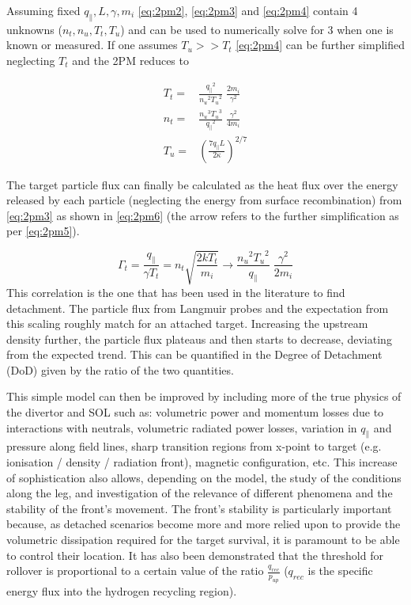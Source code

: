 Assuming fixed $q_{\parallel}, L, \gamma, m_i$ \autoref{eq:2pm2}, \ref{eq:2pm3} and \ref{eq:2pm4} contain 4 unknowns ($n_t, n_u, T_t, T_u$) and can be used to numerically solve for 3 when one is known or measured. If one assumes $T_u >> T_t$ %
\autoref{eq:2pm4} can be further simplified neglecting $T_t$ and the 2PM reduces to

\begin{equation}
\begin{aligned}
T_t =& \frac{{q_{\parallel}}^2}{{n_u}^2 {T_u}^2} \; \frac{2m_i}{\gamma^2} \\
n_t =& \frac{{n_u}^3 {T_u}^3}{{q_{\parallel}}^2} \; \frac{\gamma^2}{4m_i} \\
T_u =& \left( \frac{7 q_{\parallel} L}{2 \kappa} \right)^{2/7}
\end{aligned}
\label{eq:2pm5}
\end{equation}

The target particle flux can finally be calculated as the heat flux over the energy released by each particle (neglecting the energy from surface recombination) from \autoref{eq:2pm3} as shown in \autoref{eq:2pm6} (the arrow refers to the further simplification as per \autoref{eq:2pm5}).

\begin{equation}
\Gamma_t = \frac{q_{\parallel}}{\gamma T_t} =  n_t \sqrt{\frac{2kT_t}{m_i}} \rightarrow \frac{{n_u}^2 {T_u}^2}{q_{\parallel}} \; \frac{\gamma^2}{2m_i}
\label{eq:2pm6}
\end{equation}
This correlation is the one that has been used in the literature to find detachment. The particle flux from Langmuir probes and the expectation from this scaling roughly match for an attached target. Increasing the upstream density further, the particle flux plateaus and then starts to decrease, deviating from the expected trend. This can be quantified in the Degree of Detachment (DoD) given by the ratio of the two quantities.\cite{Stangeby2001,Loarte1998}

This simple model can then be improved by including more of the true physics of the divertor and SOL such as: volumetric power and momentum losses due to interactions with neutrals, volumetric radiated power losses, variation in $q_{\parallel}$ and pressure along field lines, sharp transition regions from x-point to target (e.g. ionisation / density / radiation front), magnetic configuration, etc.\cite{Stangeby2001,Cowley2022,Reinke2017,Lipschultz2016} This increase of sophistication also allows, depending on the model, the study of the conditions along the leg, and investigation of the relevance of different phenomena and the stability of the front's movement. The front's stability is particularly important because, as detached scenarios become more and more relied upon to provide the volumetric dissipation required for the target survival, it is paramount to be able to control their location. It has also been demonstrated that the threshold for rollover is proportional to a certain value of the ratio $ \frac {q_{rec}} {p_{up}}$ ($q_{rec}$ is the speciﬁc energy ﬂux into the hydrogen recycling region). \cite{Krasheninnikov1999,Krasheninnikov2016,Stangeby2018}

